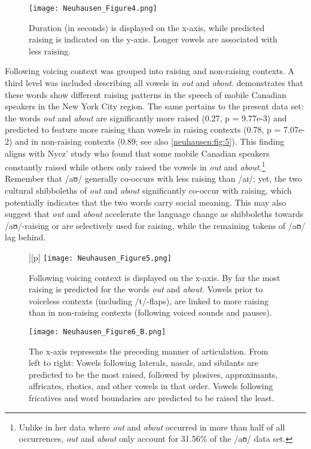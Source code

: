 \documentclass[output=paper]{langscibook}
\begin{document}
\begin{figure}
    \texttt{[image: Neuhausen\_Figure4.png]}
    \caption{Duration (in seconds) is displayed on the x-axis, while predicted raising is indicated on the y-axis. Longer vowels are associated with less raising.}
    \label{neuhausen:fig:4}
\end{figure}



\largerpage
Following voicing context was grouped into raising and non-raising contexts. A third level was included describing all vowels in \textit{out} and \textit{about}. \citet{nycz_changing_2013} demonstrates that these words show different raising patterns in the speech of mobile Canadian speakers in the New York City region. 
The same pertains to the present data set: the words \textit{out} and \textit{about} are significantly more raised (0.27, p = 9.77e-3) and predicted to feature more raising than vowels in raising contexts (0.78, p = 7.07e-2) and in non-raising contexts (0.89; see also \autoref{neuhausen:fig:5}).
 This finding aligns with Nycz’ study who found that some mobile Canadian speakers constantly raised while others only raised the vowels in \textit{out} and \textit{about}.\footnote{Unlike in her data where \textit{out} and \textit{about} occurred in more than half of all occurrences, \textit{out} and \textit{about} only account for 31.56\% of the /aʊ/ data set.} Remember that /aʊ/ generally co-occurs with less raising than /aɪ/; yet, the two cultural shibboleths of \textit{out} and \textit{about} significantly co-occur with raising, which potentially indicates that the two words carry social meaning. This may also suggest that \textit{out} and \textit{about} accelerate the language change as shibboleths towards /aʊ/-raising or are selectively used for raising, while the remaining tokens of /aʊ/ lag behind.



\begin{figure}][p]
    \texttt{[image: Neuhausen\_Figure5.png]}
    \caption{Following voicing context is displayed on the x-axis. By far the most raising is predicted for the words \textit{out} and \textit{about}. Vowels prior to voiceless contexts (including /t/-flaps), are linked to more raising than in non-raising contexts (following voiced sounds and pauses).}
    \label{neuhausen:fig:5}
\end{figure}


\begin{figure}[p]
    \texttt{[image: Neuhausen\_Figure6\_B.png]}
    \caption{The x-axis represents the preceding manner of articulation. From left to right: Vowels following laterals, nasals, and sibilants are predicted to be the most raised, followed by plosives, approximants, affricates, rhotics, and other vowels in that order. Vowels following fricatives and word boundaries are predicted to be raised the least.}
    \label{neuhausen:fig:6}
\end{figure}
\end{document}
